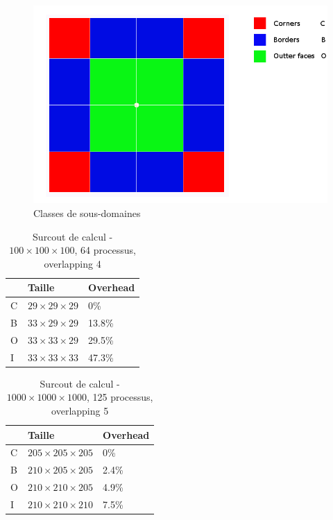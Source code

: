 \begin{figure}[h!t]
  \centering
  \includegraphics[scale=0.3]{figures/domain_dese.png}
  \caption{\label{fig:domain_desequilibre}Classes de sous-domaines}
\end{figure}

\begin{table}[h!]
  \begin{center}
    \begin{tabular}{|P{2cm}|P{3.5cm}|P{3.5cm}|}
      \hline
      & Taille & Overhead \\ \hline
      C & $29\times29\times29$ & 0\%  \\ \hline
      B & $33\times29\times29$ & 13.8\%  \\ \hline
      O & $33\times33\times29$ & 29.5\%  \\ \hline
      I & $33\times33\times33$ & 47.3\%  \\ \hline      
    \end{tabular}
    \caption{\label{arr:overlap_res}Surcout de calcul - $100\times100\times100$, 64 processus, overlapping 4}
  \end{center}
\end{table}


\begin{table}[h!]
  \begin{center}
    \begin{tabular}{|P{2cm}|P{3.5cm}|P{3.5cm}|}
      \hline
      & Taille & Overhead \\ \hline
      C & $205\times205\times205$ & 0\%    \\ \hline
      B & $210\times205\times205$ & 2.4\%  \\ \hline
      O & $210\times210\times205$ & 4.9\%  \\ \hline
      I & $210\times210\times210$ & 7.5\%  \\ \hline      
    \end{tabular}
    \caption{\label{arr:overlap_res_big}Surcout de calcul - $1000\times1000\times1000$, 125 processus, overlapping 5}
  \end{center}
\end{table}


